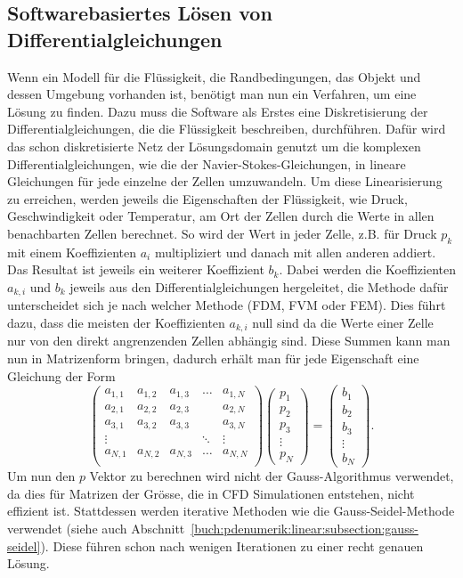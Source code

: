 \subsection{Softwarebasiertes Lösen von Differentialgleichungen}
Wenn ein Modell für die Flüssigkeit, die Randbedingungen, das Objekt und dessen Umgebung vorhanden ist, benötigt man nun ein Verfahren, um eine Lösung zu finden. 
Dazu muss die Software als Erstes eine Diskretisierung der Differentialgleichungen, die die Flüssigkeit beschreiben, durchführen.
%
Dafür wird das schon diskretisierte Netz der Lösungsdomain genutzt um die komplexen Differentialgleichungen, wie die der Navier-Stokes-Gleichungen, in lineare Gleichungen für jede einzelne der Zellen umzuwandeln.
Um diese Linearisierung zu erreichen, werden jeweils die Eigenschaften der Flüssigkeit, wie Druck, Geschwindigkeit oder Temperatur, am Ort der Zellen durch die Werte in allen benachbarten Zellen berechnet.
So wird der Wert in jeder Zelle, z.B. für Druck $p_{k}$ mit einem Koeffizienten $ a_{i} $ multipliziert und danach mit allen anderen addiert.
Das Resultat ist jeweils ein weiterer Koeffizient $b_{k}$.
Dabei werden die Koeffizienten $a_{k,i}$ und $b_{k }$ jeweils aus den Differentialgleichungen hergeleitet, die Methode dafür unterscheidet sich je nach welcher Methode (FDM, FVM oder FEM).
Dies führt dazu, dass die meisten der Koeffizienten $a_{k,i}$ null sind da die Werte einer Zelle nur von den direkt angrenzenden Zellen abhängig sind.
Diese Summen kann man nun in Matrizenform bringen, dadurch erhält man für jede Eigenschaft eine Gleichung der Form
\begin{equation}
\begin{pmatrix}
	a_{1,1} &  a_{1,2} & a_{1,3} & \dots & a_{1,N} \\
	a_{2,1} &  a_{2,2} & a_{2,3} &  & a_{2,N} \\
	a_{3,1} &  a_{3,2} & a_{3,3} &  & a_{3,N} \\
	\vdots & &  & \ddots & \vdots \\
	a_{N,1} &  a_{N,2} & a_{N,3} & \dots & a_{N,N} \\
\end{pmatrix}
\begin{pmatrix}
	p_{1} \\
	p_{2} \\
	p_{3} \\
	\vdots \\
	p_{N}
\end{pmatrix}
= 
\begin{pmatrix}
b_{1} \\
b_{2} \\
b_{3} \\
\vdots \\
b_{N}
\end{pmatrix}
.
\end{equation}
Um nun den $p$ Vektor zu berechnen wird nicht der Gauss-Algorithmus verwendet, da dies für Matrizen der Grösse, die in CFD Simulationen entstehen, nicht effizient ist.
Stattdessen werden iterative Methoden wie die Gauss-Seidel-Methode verwendet (siehe auch Abschnitt~\ref{buch:pdenumerik:linear:subsection:gauss-seidel}).
Diese führen schon nach wenigen Iterationen zu einer recht genauen Lösung.
